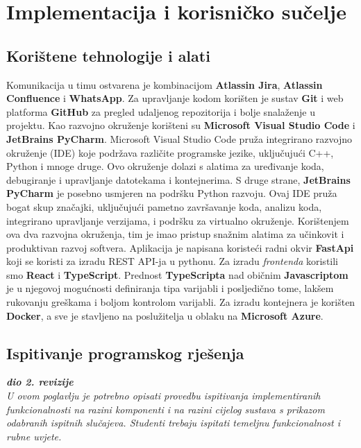 \chapter{Implementacija i korisničko sučelje}
		
		
		\section{Korištene tehnologije i alati}
		
			Komunikacija u timu ostvarena je kombinacijom \textbf{Atlassin Jira}, \textbf{Atlassin Confluence} i \textbf{WhatsApp}. Za upravljanje kodom korišten je sustav \textbf{Git} i web platforma \textbf{GitHub} za pregled udaljenog repozitorija i bolje snalaženje u projektu.
			Kao razvojno okruženje korišteni su \textbf{Microsoft Visual Studio Code} i \textbf{JetBrains PyCharm}. Microsoft Visual Studio Code pruža integrirano razvojno okruženje (IDE) koje podržava različite programske jezike, uključujući C++, Python i mnoge druge. Ovo okruženje dolazi s alatima za uređivanje koda, debugiranje i upravljanje datotekama i kontejnerima.
			S druge strane, \textbf{JetBrains PyCharm} je posebno usmjeren na podršku Python razvoju. Ovaj IDE pruža bogat skup značajki, uključujući pametno završavanje koda, analizu koda, integrirano upravljanje verzijama, i podršku za virtualno okruženje. Korištenjem ova dva razvojna okruženja, tim je imao pristup snažnim alatima za učinkovit i produktivan razvoj softvera.
			Aplikacija je napisana koristeći radni okvir \textbf{FastApi} koji se koristi za izradu REST API-ja u pythonu. Za izradu \textit{frontenda} koristili smo \textbf{React} i \textbf{TypeScript}. Prednost \textbf{TypeScripta} nad običnim \textbf{Javascriptom} je u njegovoj mogućnosti definiranja tipa varijabli i posljedično tome, lakšem rukovanju greškama i boljom kontrolom varijabli.
			Za izradu kontejnera je korišten \textbf{Docker}, a sve je stavljeno na poslužitelja u oblaku na \textbf{Microsoft Azure}.
			
			
			
			\eject 
		
	
		\section{Ispitivanje programskog rješenja}
			
			\textbf{\textit{dio 2. revizije}}\\
			
			 \textit{U ovom poglavlju je potrebno opisati provedbu ispitivanja implementiranih funkcionalnosti na razini komponenti i na razini cijelog sustava s prikazom odabranih ispitnih slučajeva. Studenti trebaju ispitati temeljnu funkcionalnost i rubne uvjete.}
	
